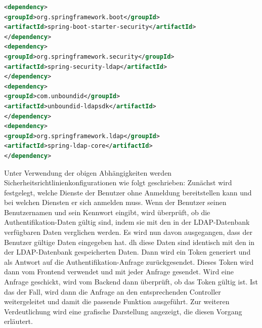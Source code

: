 \documentclass[a4paper,12pt,oneside]{book}
\begin{document}
\begin{lstlisting}[language=XML,caption=pom.xml - security dependencies]
<dependency>
<groupId>org.springframework.boot</groupId>
<artifactId>spring-boot-starter-security</artifactId>
</dependency>
<dependency>
<groupId>org.springframework.security</groupId>
<artifactId>spring-security-ldap</artifactId>
</dependency>
<dependency>
<groupId>com.unboundid</groupId>
<artifactId>unboundid-ldapsdk</artifactId>
</dependency>
<dependency>
<groupId>org.springframework.ldap</groupId>
<artifactId>spring-ldap-core</artifactId>
</dependency>
\end{lstlisting}
Unter Verwendung der obigen Abhängigkeiten werden Sicherheitsrichtlinienkonfigurationen wie folgt geschrieben: Zunächst wird festgelegt, welche Dienste der Benutzer ohne Anmeldung bereitstellen kann und bei welchen Diensten er sich anmelden muss. Wenn der Benutzer seinen Benutzernamen und sein Kennwort eingibt, wird überprüft, ob die Authentifikation-Daten gültig sind, indem sie mit den in der LDAP-Datenbank verfügbaren Daten verglichen werden.
\newline
Es wird nun davon ausgegangen, dass der Benutzer gültige Daten eingegeben hat. dh diese Daten sind identisch mit den in der LDAP-Datenbank gespeicherten Daten. Dann wird ein Token generiert und als Antwort auf die Authentifikation-Anfrage zurückgesendet. Dieses Token wird dann vom Frontend verwendet und mit jeder Anfrage gesendet.
\newline
Wird eine Anfrage geschickt, wird vom Backend dann überprüft, ob das Token gültig ist. Ist das der Fall, wird dann die Anfrage an den entsprechenden Controller weitergeleitet und damit die passende Funktion ausgeführt.
Zur weiteren Verdeutlichung wird eine grafische Darstellung angezeigt, die diesen Vorgang erläutert.
\end{document}
